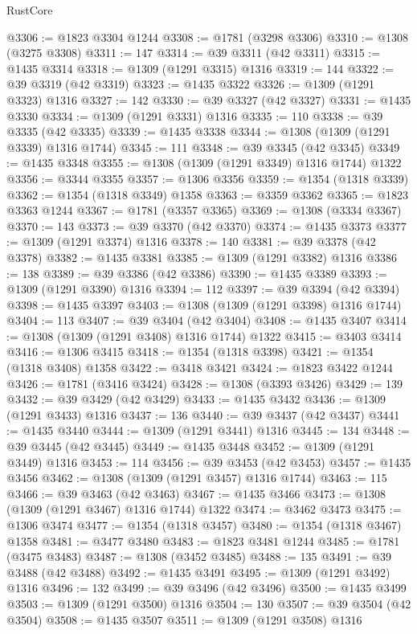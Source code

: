 \begin{lexlean}{RustCore}
\begin{coremodule}
@3306 := @1823 @3304 @1244
@3308 := @1781 (@3298 @3306)
@3310 := @1308 (@3275 @3308)
@3311 := 147
@3314 := @39 @3311 (@42 @3311)
@3315 := @1435 @3314
@3318 := @1309 (@1291 @3315) @1316
@3319 := 144
@3322 := @39 @3319 (@42 @3319)
@3323 := @1435 @3322
@3326 := @1309 (@1291 @3323) @1316
@3327 := 142
@3330 := @39 @3327 (@42 @3327)
@3331 := @1435 @3330
@3334 := @1309 (@1291 @3331) @1316
@3335 := 110
@3338 := @39 @3335 (@42 @3335)
@3339 := @1435 @3338
@3344 := @1308 (@1309 (@1291 @3339) @1316 @1744)
@3345 := 111
@3348 := @39 @3345 (@42 @3345)
@3349 := @1435 @3348
@3355 := @1308 (@1309 (@1291 @3349) @1316 @1744) @1322
@3356 := @3344 @3355
@3357 := @1306 @3356
@3359 := @1354 (@1318 @3339)
@3362 := @1354 (@1318 @3349) @1358
@3363 := @3359 @3362
@3365 := @1823 @3363 @1244
@3367 := @1781 (@3357 @3365)
@3369 := @1308 (@3334 @3367)
@3370 := 143
@3373 := @39 @3370 (@42 @3370)
@3374 := @1435 @3373
@3377 := @1309 (@1291 @3374) @1316
@3378 := 140
@3381 := @39 @3378 (@42 @3378)
@3382 := @1435 @3381
@3385 := @1309 (@1291 @3382) @1316
@3386 := 138
@3389 := @39 @3386 (@42 @3386)
@3390 := @1435 @3389
@3393 := @1309 (@1291 @3390) @1316
@3394 := 112
@3397 := @39 @3394 (@42 @3394)
@3398 := @1435 @3397
@3403 := @1308 (@1309 (@1291 @3398) @1316 @1744)
@3404 := 113
@3407 := @39 @3404 (@42 @3404)
@3408 := @1435 @3407
@3414 := @1308 (@1309 (@1291 @3408) @1316 @1744) @1322
@3415 := @3403 @3414
@3416 := @1306 @3415
@3418 := @1354 (@1318 @3398)
@3421 := @1354 (@1318 @3408) @1358
@3422 := @3418 @3421
@3424 := @1823 @3422 @1244
@3426 := @1781 (@3416 @3424)
@3428 := @1308 (@3393 @3426)
@3429 := 139
@3432 := @39 @3429 (@42 @3429)
@3433 := @1435 @3432
@3436 := @1309 (@1291 @3433) @1316
@3437 := 136
@3440 := @39 @3437 (@42 @3437)
@3441 := @1435 @3440
@3444 := @1309 (@1291 @3441) @1316
@3445 := 134
@3448 := @39 @3445 (@42 @3445)
@3449 := @1435 @3448
@3452 := @1309 (@1291 @3449) @1316
@3453 := 114
@3456 := @39 @3453 (@42 @3453)
@3457 := @1435 @3456
@3462 := @1308 (@1309 (@1291 @3457) @1316 @1744)
@3463 := 115
@3466 := @39 @3463 (@42 @3463)
@3467 := @1435 @3466
@3473 := @1308 (@1309 (@1291 @3467) @1316 @1744) @1322
@3474 := @3462 @3473
@3475 := @1306 @3474
@3477 := @1354 (@1318 @3457)
@3480 := @1354 (@1318 @3467) @1358
@3481 := @3477 @3480
@3483 := @1823 @3481 @1244
@3485 := @1781 (@3475 @3483)
@3487 := @1308 (@3452 @3485)
@3488 := 135
@3491 := @39 @3488 (@42 @3488)
@3492 := @1435 @3491
@3495 := @1309 (@1291 @3492) @1316
@3496 := 132
@3499 := @39 @3496 (@42 @3496)
@3500 := @1435 @3499
@3503 := @1309 (@1291 @3500) @1316
@3504 := 130
@3507 := @39 @3504 (@42 @3504)
@3508 := @1435 @3507
@3511 := @1309 (@1291 @3508) @1316

\end{coremodule}
\end{lexlean}
